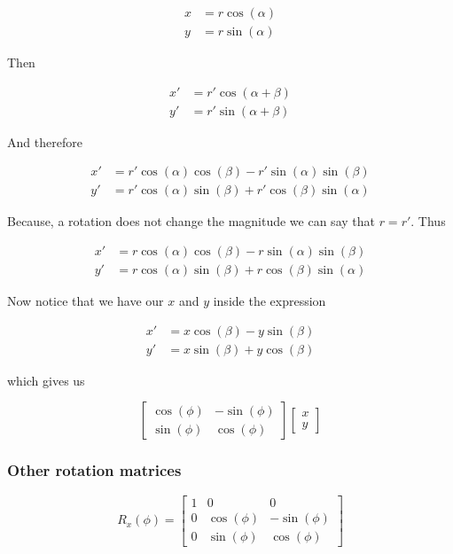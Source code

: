 \begin{align*}
    x &= r \cos(\alpha)\\
    y &= r \sin(\alpha)
\end{align*}

Then 

\begin{align*}
    x' &= r' \cos(\alpha + \beta)\\
    y' &= r' \sin(\alpha + \beta)
\end{align*}

And therefore

\begin{align*}
    x' &= r' \cos(\alpha)\cos(\beta) - r'\sin(\alpha)\sin(\beta)\\
    y' &= r' \cos(\alpha)\sin(\beta) + r'\cos(\beta)\sin(\alpha)
\end{align*}

Because, a rotation does not change the magnitude we can say that \(r = r'\). Thus 

\begin{align*}
    x' &= r \cos(\alpha)\cos(\beta) - r\sin(\alpha)\sin(\beta)\\
    y' &= r \cos(\alpha)\sin(\beta) + r\cos(\beta)\sin(\alpha)
\end{align*}

Now notice that we have our \(x\) and \(y\) inside the expression

\begin{align*}
    x' &= x\cos(\beta) - y\sin(\beta)\\
    y' &= x\sin(\beta) + y\cos(\beta)
\end{align*}

which gives us 

\[
    \begin{bmatrix}
        \cos(\phi) & -\sin(\phi)\\
        \sin(\phi) & \cos(\phi)
    \end{bmatrix}
    \begin{bmatrix}
        x\\
        y
    \end{bmatrix}
\]

\QED

\subsubsection{Other rotation matrices}

\[
    R_x (\phi) =
    \begin{bmatrix}
        1 & 0 & 0 \\
        0 & \cos(\phi) & -\sin(\phi) \\
        0 & \sin(\phi) & \cos(\phi)
    \end{bmatrix}
\]

